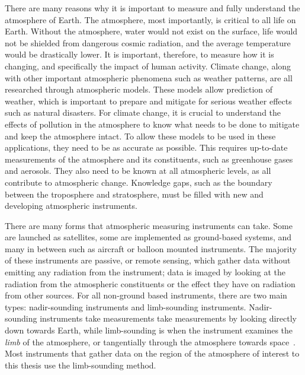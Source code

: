 There are many reasons why it is important to measure and fully understand the atmosphere of Earth. The atmosphere, most importantly, is critical to all life on Earth. Without the atmosphere, water would not exist on the surface, life would not be shielded from dangerous cosmic radiation, and the average temperature would be drastically lower. It is important, therefore, to measure how it is changing, and specifically the impact of human activity. Climate change, along with other important atmospheric phenomena such as weather patterns, are all researched through atmospheric models. These models allow prediction of weather, which is important to prepare and mitigate for serious weather effects such as natural disasters. For climate change, it is crucial to understand the effects of pollution in the atmosphere to know what needs to be done to mitigate and keep the atmosphere intact. To allow these models to be used in these applications, they need to be as accurate as possible. This requires up-to-date measurements of the atmosphere and its constituents, such as greenhouse gases and aerosols. They also need to be known at all atmospheric levels, as all contribute to atmospheric change. Knowledge gaps, such as the boundary between the troposphere and stratosphere, must be filled with new and developing atmospheric instruments.

There are many forms that atmospheric measuring instruments can take. Some are launched as satellites, some are implemented as ground-based systems, and many in between such as aircraft or balloon mounted instruments. The majority of these instruments are passive, or remote sensing, which gather data without emitting any radiation from the instrument; data is imaged by looking at the radiation from the atmospheric constituents or the effect they have on radiation from other sources. For all non-ground based instruments, there are two main types: nadir-sounding instruments and limb-sounding instruments. Nadir-sounding instruments take measurements take measurements by looking directly down towards Earth, while limb-sounding is when the instrument examines the \textit{limb} of the atmosphere, or tangentially through the atmosphere towards space~\citep{SPARC}. Most instruments that gather data on the region of the atmosphere of interest to this thesis use the limb-sounding method.

